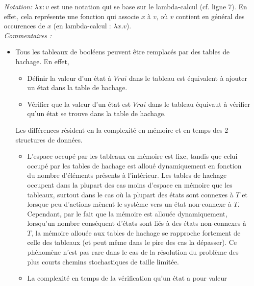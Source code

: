 \documentclass[12pt,a4paper]{report}
\theoremstyle{definition}%
\theoremstyle{remark}
\let\labelitemi\labelitemii
\begin{document}
\newpage
\textit{Notation:} $\lambda x: v$ est une notation qui se base sur le
lambda-calcul (cf. ligne 7). En effet, cela représente une fonction qui
associe $x$ à $v$, où $v$ contient en général des occurences de $x$ (en
lambda-calcul : $\lambda x.v$). \\

\textit{Commentaires :}
\begin{itemize}
	\renewcommand{\labelitemi}{\tiny$\bullet$}
	\item Tous les tableaux de booléens peuvent être remplacés par des tables de
		hachage. En effet,
		\begin{itemize}
			\item Définir la valeur d'un état à $Vrai$ dans le tableau est équivalent
				à ajouter un état dans la table de hachage.
			\item Vérifier que la valeur d'un état est $Vrai$ dans le tableau équivaut
				à vérifier qu'un état se trouve dans la table de hachage.
		\end{itemize}
		Les différences résident en la complexité en mémoire et en temps des 2 structures de données.
		\begin{itemize}
			\item L'espace occupé par les tableaux en mémoire est fixe, tandis que celui occupé par les tables de hachage est alloué dynamiquement en fonction du nombre d'éléments présents à l'intérieur.
			Les tables de hachage
				occupent dans la plupart des cas moins d'espace en mémoire que les tableaux, surtout dans le cas où la plupart des états
				sont connexes à $T$ et lorsque peu d'actions mènent le système vers un
				état non-connexe à $T$. Cependant, par le fait que la mémoire est allouée dynamiquement, lorsqu'un nombre conséquent d'états sont liés
				à des états non-connexes à $T$, la mémoire allouée aux tables de hachage se rapproche fortement de celle des tableaux (et peut même dans le pire des cas la dépasser). Ce phénomène n'est pas rare dans le cas de
				la résolution du problème des plus courts chemins stochastiques de taille limitée.
			\item La complexité en temps de la vérification qu'un état a pour valeur

\end{itemize}
\end{itemize}
\end{document}

